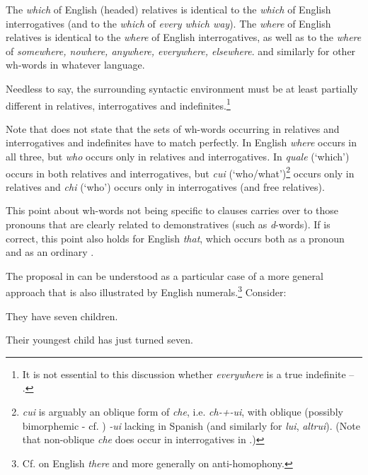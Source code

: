 \documentclass[output=paper]{LSP/langsci}
\begin{document}
  \ea\label{ex:kayne:2}
  \ea  The \textit{which} of English (headed) relatives is identical to the \textit{which} of English interrogatives (and to the \textit{which} of \textit{every which way}).
\ex  The \textit{where} of English relatives is identical to the \textit{where} of English interrogatives, as well as to the \textit{where} of \textit{somewhere, nowhere, anywhere, everywhere, elsewhere}.
\ex  and similarly for other wh-words in whatever language.
\z
\z

Needless to say, the surrounding syntactic environment must be at least partially different in relatives, interrogatives and indefinites.\footnote{It is not essential to this discussion whether \textit{everywhere} is a true indefinite -- \citet{BeghelliStowell1997}.}

     Note that  does not state that the sets of wh-words occurring in relatives and interrogatives and indefinites have to match perfectly.  In English \textit{where} occurs in all three, but \textit{who} occurs only in relatives and interrogatives\textit{.} In  \textit{quale} (‘which’) occurs in both relatives and interrogatives, but \textit{cui} (‘who/what’)\footnote{ \textit{cui} is arguably an oblique form of \textit{che}, i.e. \textit{ch-+-ui}, with oblique (possibly bimorphemic - cf. \citet{Martín2012}) \textit{-ui} lacking in Spanish (and similarly for  \textit{lui}, \textit{altrui}).  (Note that non-oblique \textit{che} does occur in interrogatives in .)} occurs only in relatives and \textit{chi} (‘who’) occurs only in interrogatives (and free relatives).

     This point about wh-words not being specific to  clauses carries over to those  pronouns that are clearly related to demonstratives (such as   \textit{d}{}-words).  If \citet{Kayne2010a} is correct, this point also holds for English \textit{that}, which occurs both as a  pronoun and as an ordinary .

     The proposal in  can be understood as a particular case of a more general approach that is also illustrated by English numerals.\footnote{Cf. \citet{Kayne2016} on English \textit{there} and more generally on anti-homophony.}  Consider:

\ea\label{ex:kayne:3}
   They have seven children.
\z

\ea\label{ex:kayne:4}
   Their youngest child has just turned seven.
\z
\end{document}
